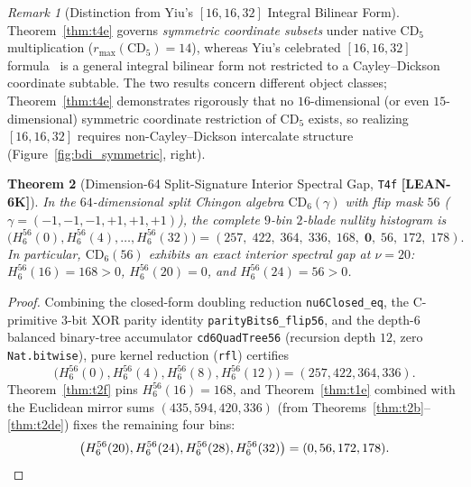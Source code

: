 \documentclass[11pt,reqno]{amsart}
\newcommand{\code}[1]{\textnormal{\texttt{\small\nolinkurl{#1}}}}
\theoremstyle{plain}
\newtheorem{theorem}{Theorem}[section]
\theoremstyle{definition}
\theoremstyle{remark}
\newtheorem{remark}[theorem]{Remark}
\newcommand{\tagLean}{\mbox{\textsf{\textbf{\color{oiBlue}[LEAN-6K]}}}}
\newcommand{\CD}{\mathrm{CD}}
\begin{document}
\begin{remark}[Distinction from Yiu's {$[16, 16, 32]$} Integral Bilinear Form]
Theorem~\ref{thm:t4e} governs \emph{symmetric coordinate subsets} under native $\CD_5$
multiplication ($r_{\max}(\CD_5) = 14$), whereas Yiu's celebrated $[16, 16, 32]$
formula~\cite{yiu1990} is a general integral bilinear form not restricted to a Cayley--Dickson
coordinate subtable. The two results concern different object classes; Theorem~\ref{thm:t4e}
demonstrates rigorously that no $16$-dimensional (or even $15$-dimensional) symmetric coordinate
restriction of $\CD_5$ exists, so realizing $[16, 16, 32]$ requires non-Cayley--Dickson
intercalate structure (Figure~\ref{fig:bdi_symmetric}, right).
\end{remark}

\begin{theorem}[Dimension-64 Split-Signature Interior Spectral Gap, \texttt{T4f} \tagLean]
\label{thm:t4f}
In the $64$-dimensional split Chingon algebra $\CD_6(\gamma)$ with flip mask $56$
($\gamma = (-1, -1, -1, +1, +1, +1)$), the complete $9$-bin $2$-blade nullity histogram is
\begin{equation}
  \bigl(H_6^{56}(0), H_6^{56}(4), \dots, H_6^{56}(32)\bigr)
  = (257,\; 422,\; 364,\; 336,\; 168,\; \mathbf{0},\; 56,\; 172,\; 178).
\end{equation}
In particular, $\CD_6(56)$ exhibits an exact interior spectral gap at $\nu = 20$:
$H_6^{56}(16) = 168 > 0$, $H_6^{56}(20) = 0$, and $H_6^{56}(24) = 56 > 0$.
\end{theorem}

\begin{proof}
Combining the closed-form doubling reduction \code{nu6Closed_eq}, the C-primitive $3$-bit XOR
parity identity \code{parityBits6_flip56}, and the depth-$6$ balanced binary-tree accumulator
\code{cd6QuadTree56} (recursion depth $12$, zero \code{Nat.bitwise}), pure kernel reduction
(\code{rfl}) certifies
\[
  \bigl(H_6^{56}(0), H_6^{56}(4), H_6^{56}(8), H_6^{56}(12)\bigr) = (257, 422, 364, 336).
\]
Theorem~\ref{thm:t2f} pins $H_6^{56}(16) = 168$, and Theorem~\ref{thm:t1e} combined with the
Euclidean mirror sums $(435, 594, 420, 336)$ (from Theorems~\ref{thm:t2b}--\ref{thm:t2de})
fixes the remaining four bins:
\[
  \bigl(H_6^{56}(20), H_6^{56}(24), H_6^{56}(28), H_6^{56}(32)\bigr) = (0, 56, 172, 178). \qedhere
\]
\end{proof}
\end{document}
